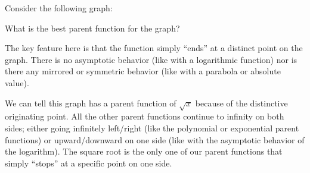 \documentclass{ximera}
\begin{document}
\begin{problem}
    Consider the following graph:
    \begin{center}
    \end{center}
    
    What is the best parent function for the graph?
    
    \begin{multipleChoice}
    \end{multipleChoice}
    
    
    \begin{feedback}
        The key feature here is that the function simply ``ends'' at a distinct point on the graph. There is no asymptotic behavior (like with a logarithmic function) nor is there any mirrored or symmetric behavior (like with a parabola or absolute value).
    \end{feedback}
    \begin{feedback}[correct]
        We can tell this graph has a parent function of $\sqrt{x}$ because of the distinctive originating point. All the other parent functions continue to infinity on both sides; either going infinitely left/right (like the polynomial or exponential parent functions) or upward/downward on one side (like with the asymptotic behavior of the logarithm). The square root is the only one of our parent functions that simply ``stops'' at a specific point on one side.
    \end{feedback}
    
\end{problem}
        
        
                
        
\end{document}
